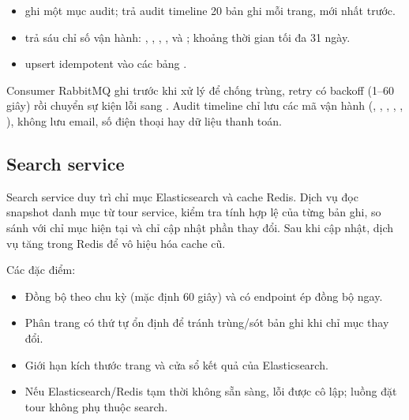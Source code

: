\begin{itemize}
  \item {} ghi một mục audit;  trả audit timeline 20 bản ghi mỗi trang, mới nhất trước.
  \item {} trả sáu chỉ số vận hành: , , , ,  và ; khoảng thời gian tối đa 31 ngày.
  \item {} upsert idempotent vào các bảng .
\end{itemize}

Consumer RabbitMQ ghi  trước khi xử lý để chống trùng, retry có backoff (1--60 giây) rồi chuyển sự kiện lỗi sang . Audit timeline chỉ lưu các mã vận hành (, , , , , ), không lưu email, số điện thoại hay dữ liệu thanh toán.

\subsection{Search service}
\label{subsec:search-service}

Search service duy trì chỉ mục Elasticsearch và cache Redis. Dịch vụ đọc snapshot danh mục từ tour service, kiểm tra tính hợp lệ của từng bản ghi, so sánh với chỉ mục hiện tại và chỉ cập nhật phần thay đổi. Sau khi cập nhật, dịch vụ tăng  trong Redis để vô hiệu hóa cache cũ.

Các đặc điểm:

\begin{itemize}
  \item Đồng bộ theo chu kỳ (mặc định 60 giây) và có endpoint ép đồng bộ ngay.
  \item Phân trang có thứ tự ổn định để tránh trùng/sót bản ghi khi chỉ mục thay đổi.
  \item Giới hạn kích thước trang và cửa sổ kết quả của Elasticsearch.
  \item Nếu Elasticsearch/Redis tạm thời không sẵn sàng, lỗi được cô lập; luồng đặt tour không phụ thuộc search.
\end{itemize}

